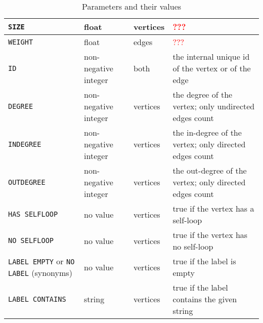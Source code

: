 \begin{table}
\begin{tabular}{p{3cm}|p{5cm}|p{1.8cm}|p{5cm}}
    \texttt{SIZE} & float                      & vertices \tcr{?}  & \textcolor{red}{???}\\
    \hline
    \texttt{WEIGHT} & float                      & edges  &
                                                            \textcolor{red}{???}\\
    \hline
    \texttt{ID}      & non-negative integer   & both & the internal unique id of
                                                       the vertex or of the edge\\
    \hline
    \texttt{DEGREE}    & non-negative integer & vertices & the degree of
                                                           the vertex;
                                                           only
                                                           undirected
                                                           edges count\\
    \hline
    \texttt{INDEGREE}    & non-negative integer & vertices & the in-degree of
                                                             the vertex;
                                                             only
                                                             directed
                                                             edges count\\
    \hline
    \texttt{OUTDEGREE}    & non-negative integer & vertices & the out-degree of
                                                              the vertex;
                                                              only
                                                              directed
                                                              edges count\\
    \hline
    \texttt{HAS SELFLOOP}  & no value & vertices & true if the vertex
                                                   has a self-loop\\
    \hline
    \texttt{NO SELFLOOP}  & no value & vertices & true if the vertex
                                                  has no self-loop\\
    \hline
    \texttt{LABEL EMPTY} or \texttt{NO LABEL} (synonyms)
                       & no value & vertices & true if the label is
                                               empty\\
    \hline
    \texttt{LABEL CONTAINS} & string & vertices & true if the label
                                                  contains the given string\\
    \hline
  \end{tabular}
  \caption{Parameters and their values}
  \label{tab:parsAndVals}
\end{table}

